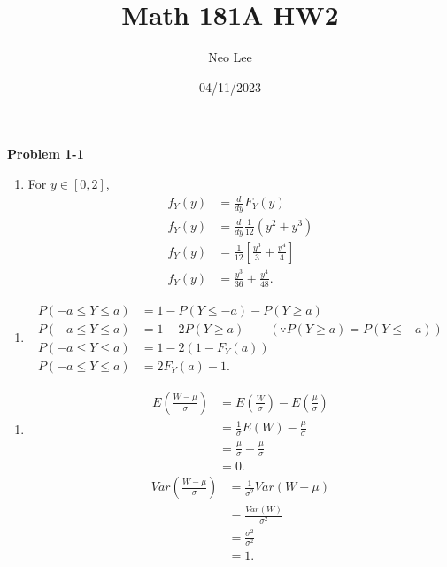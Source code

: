 \documentclass{article}
\title{Math 181A HW2}
\author{Neo Lee}
\date{04/11/2023}
\begin{document}
 

\maketitle 

\textbf{Problem 1-1}
\begin{enumerate}[label={(3.4.13)}]
    \item 
    For $y \in [0,2]$,
    \begin{align}
        f_Y(y) &= \frac{d}{dy}F_Y(y) \nonumber \\
        f_Y(y) &= \frac{d}{dy}\frac{1}{12}(y^2 + y^3) \nonumber \\
        f_Y(y) &= \frac{1}{12}\left[\frac{y^3}{3}+\frac{y^4}{4}\right] \nonumber \\
        f_Y(y) &= \frac{y^3}{36} + \frac{y^4}{48}. \nonumber 
    \end{align}
\end{enumerate}
\begin{enumerate}[label={(3.4.17)}]
    \item 
    \begin{align}
        P(-a \le Y \le a) & = 1 - P(Y \le -a) - P(Y \ge a) \nonumber \\
        P(-a \le Y \le a) & = 1 - 2P(Y \ge a) \nonumber \qquad (\because P(Y \ge a) = P(Y \le -a)) \\
        P(-a \le Y \le a) & = 1 - 2(1-F_Y(a)) \nonumber \\
        P(-a \le Y \le a) & = 2F_Y(a) - 1. \nonumber
    \end{align}
\end{enumerate}
\begin{enumerate}[label={(3.6.16)}]
    \item 
    \begin{align}
        E\left(\frac{W-\mu}{\sigma}\right) & = E\left(\frac{W}{\sigma}\right) - E\left(\frac{\mu}{\sigma}\right) \nonumber \\
        & = \frac{1}{\sigma}E(W) - \frac{\mu}{\sigma} \nonumber \\
        & = \frac{\mu}{\sigma} - \frac{\mu}{\sigma} \nonumber \\
        & = 0.\nonumber
    \end{align}
    \begin{align}
        Var\left(\frac{W-\mu}{\sigma}\right) & = \frac{1}{\sigma^2} Var(W-\mu) \nonumber \\
        & = \frac{Var(W)}{\sigma^2} \nonumber \\
        & = \frac{\sigma^2}{\sigma^2} \nonumber \\
        & = 1.\nonumber
    \end{align}
\end{enumerate}
\bigbreak
\end{document}
